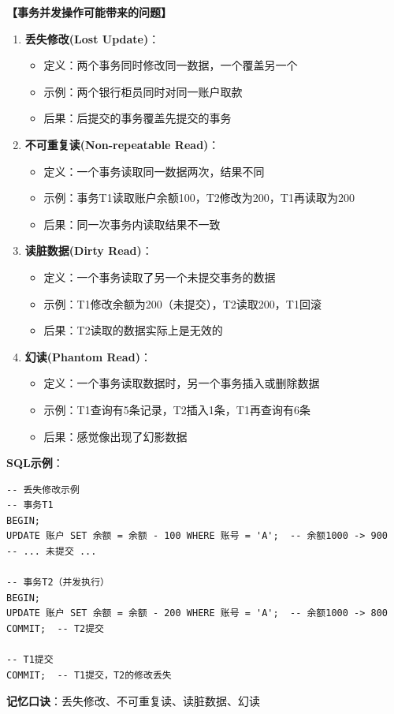 \documentclass[12pt, a4paper]{article}
\newenvironment{bluebox}[1]{%
  \begin{trivlist}
  \item[\hskip\labelsep \textbf{#1}]
  \setlength{\parskip}{0.5ex}
  \setlength{\itemsep}{0.5ex}
}{%
  \end{trivlist}
  }
\begin{document}
\begin{bluebox}{并发问题}
	\textbf{【事务并发操作可能带来的问题】}

	\begin{enumerate}[leftmargin=*, label=\textbf{\arabic*.}]
		\item \textbf{丢失修改(Lost Update)}：
		      \begin{itemize}[nosep]
			      \item 定义：两个事务同时修改同一数据，一个覆盖另一个
			      \item 示例：两个银行柜员同时对同一账户取款
			      \item 后果：后提交的事务覆盖先提交的事务
		      \end{itemize}

		\item \textbf{不可重复读(Non-repeatable Read)}：
		      \begin{itemize}[nosep]
			      \item 定义：一个事务读取同一数据两次，结果不同
			      \item 示例：事务T1读取账户余额100，T2修改为200，T1再读取为200
			      \item 后果：同一次事务内读取结果不一致
		      \end{itemize}

		\item \textbf{读脏数据(Dirty Read)}：
		      \begin{itemize}[nosep]
			      \item 定义：一个事务读取了另一个未提交事务的数据
			      \item 示例：T1修改余额为200（未提交），T2读取200，T1回滚
			      \item 后果：T2读取的数据实际上是无效的
		      \end{itemize}

		\item \textbf{幻读(Phantom Read)}：
		      \begin{itemize}[nosep]
			      \item 定义：一个事务读取数据时，另一个事务插入或删除数据
			      \item 示例：T1查询有5条记录，T2插入1条，T1再查询有6条
			      \item 后果：感觉像出现了幻影数据
		      \end{itemize}
	\end{enumerate}

	\textbf{SQL示例}：
	\begin{verbatim}
-- 丢失修改示例
-- 事务T1
BEGIN;
UPDATE 账户 SET 余额 = 余额 - 100 WHERE 账号 = 'A';  -- 余额1000 -> 900
-- ... 未提交 ...

-- 事务T2（并发执行）
BEGIN;
UPDATE 账户 SET 余额 = 余额 - 200 WHERE 账号 = 'A';  -- 余额1000 -> 800
COMMIT;  -- T2提交

-- T1提交
COMMIT;  -- T1提交，T2的修改丢失
	\end{verbatim}

	\textbf{记忆口诀}：丢失修改、不可重复读、读脏数据、幻读
\end{bluebox}
\end{document}
